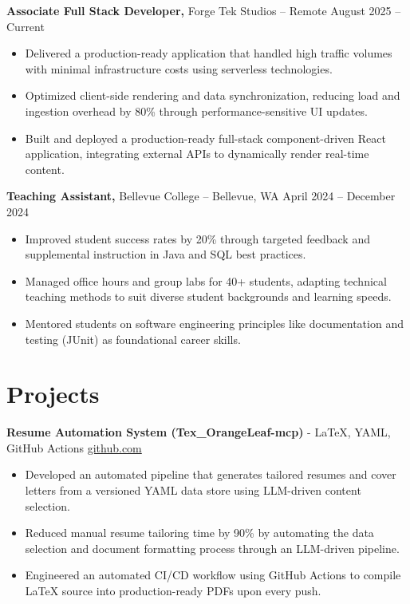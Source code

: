 \documentclass[11pt]{article}       %
\begin{document}
\textbf{Associate Full Stack Developer,} {Forge Tek Studios} -- Remote \hfill August 2025 -- Current 
\vspace{-9pt}
\begin{itemize}
  \item Delivered a production-ready application that handled high traffic volumes with minimal infrastructure costs using serverless technologies.
  \item Optimized client-side rendering and data synchronization, reducing load and ingestion overhead by 80\% through performance-sensitive UI updates.
  \item Built and deployed a production-ready full-stack component-driven React application, integrating external APIs to dynamically render real-time content.
\end{itemize}

\textbf{Teaching Assistant,} {Bellevue College} -- Bellevue, WA \hfill April 2024 -- December 2024 \\
\vspace{-9pt}
\begin{itemize}
  \item Improved student success rates by 20\% through targeted feedback and supplemental instruction in Java and SQL best practices.
  \item Managed office hours and group labs for 40+ students, adapting technical teaching methods to suit diverse student backgrounds and learning speeds.
  \item Mentored students on software engineering principles like documentation and testing (JUnit) as foundational career skills.
\end{itemize}

\vspace{-18.5pt}

\section*{Projects}

\textbf{Resume Automation System (Tex\_OrangeLeaf-mcp)}{ - LaTeX, YAML, GitHub Actions} \hfill \href{https://github.com/Monica20030707/Tex_OrangeLeaf-mcp}{github.com} \\
\vspace{-9pt}
\begin{itemize}
  \item Developed an automated pipeline that generates tailored resumes and cover letters from a versioned YAML data store using LLM-driven content selection.
  \item Reduced manual resume tailoring time by 90\% by automating the data selection and document formatting process through an LLM-driven pipeline.
  \item Engineered an automated CI/CD workflow using GitHub Actions to compile LaTeX source into production-ready PDFs upon every push.
\end{itemize}
\end{document}
